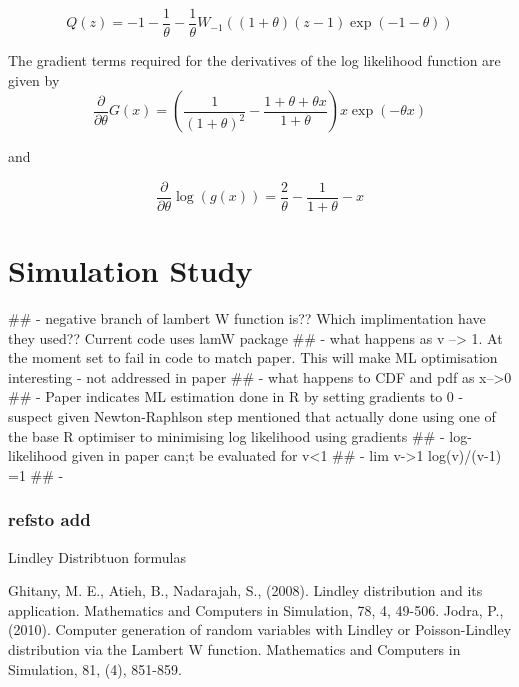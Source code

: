\begin{equation}
Q\left(z\right) = -1 - \frac{1}{\theta} - \frac{1}{\theta}W_{-1}\left( \left(1+\theta\right)\left(z-1\right)\exp\left(-1-\theta\right)\right)
\end{equation}

The gradient terms required for the derivatives of the log likelihood function are given by
\begin{equation}
\frac{\partial}{\partial \theta} G\left(x\right) = \left( \frac{1}{\left(1+\theta\right)^{2}} - \frac{1+\theta + \theta x}{1+\theta}\right) x \exp\left(-\theta x\right)
\end{equation}

and

\begin{equation}
\frac{\partial}{\partial \theta} \log \left( g\left(x\right) \right) = \frac{2}{\theta} - \frac{1}{1+\theta} -x
\end{equation}



\section{Simulation Study}
\label{sec:sim}
## - negative branch of lambert W function is?? Which implimentation have they used?? Current code uses lamW package
## - what happens as v --> 1. At the moment set to fail in code to match paper. This will make ML optimisation interesting - not addressed in paper
## - what happens to CDF and pdf as x-->0
## - Paper indicates ML estimation done in R by setting gradients to 0 - suspect given Newton-Raphlson step mentioned that actually done using one of the base R optimiser to minimising log likelihood using gradients
## - log-likelihood given in paper can;t be evaluated for v<1
## - lim v->1 log(v)/(v-1) =1
## - 






\subsubsection{refsto add}

Lindley Distribtuon formulas

Ghitany, M. E., Atieh, B., Nadarajah, S., (2008). Lindley distribution and its application. Mathematics and Computers in Simulation, 78, 4, 49-506.
Jodra, P., (2010). Computer generation of random variables with Lindley or Poisson-Lindley distribution via the Lambert W function. Mathematics and Computers in Simulation, 81, (4), 851-859.


